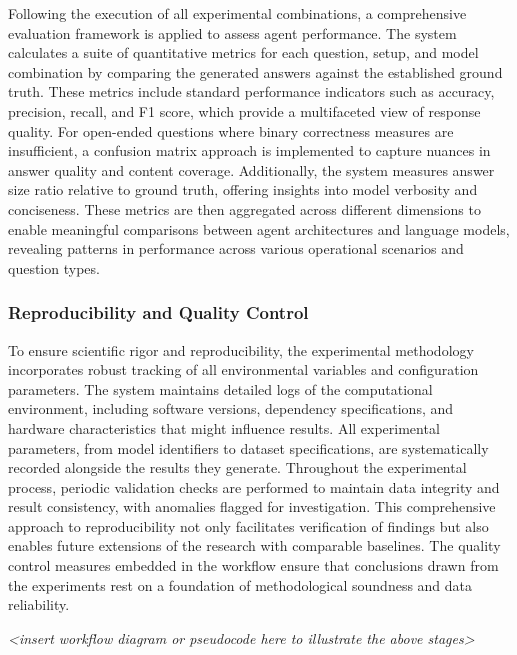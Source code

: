                 Following the execution of all experimental combinations, a comprehensive evaluation framework is applied to assess agent performance. 
                The system calculates a suite of quantitative metrics for each question, setup, and model combination by comparing the generated answers against the established ground truth. 
                These metrics include standard performance indicators such as accuracy, precision, recall, and F1 score, which provide a multifaceted view of response quality. For open-ended questions where binary correctness measures are insufficient, a confusion matrix approach is implemented to capture nuances in answer quality and content coverage. Additionally, the system measures answer size ratio relative to ground truth, offering insights into model verbosity and conciseness. 
                These metrics are then aggregated across different dimensions to enable meaningful comparisons between agent architectures and language models, revealing patterns in performance across various operational scenarios and question types.

            \subsubsection{Reproducibility and Quality Control}

                To ensure scientific rigor and reproducibility, the experimental methodology incorporates robust tracking of all environmental variables and configuration parameters. 
                The system maintains detailed logs of the computational environment, including software versions, dependency specifications, and hardware characteristics that might influence results. 
                All experimental parameters, from model identifiers to dataset specifications, are systematically recorded alongside the results they generate. Throughout the experimental process, periodic validation checks are performed to maintain data integrity and result consistency, with anomalies flagged for investigation. This comprehensive approach to reproducibility not only facilitates verification of findings but also enables future extensions of the research with comparable baselines. The quality control measures embedded in the workflow ensure that conclusions drawn from the experiments rest on a foundation of methodological soundness and data reliability.

                \textit{<insert workflow diagram or pseudocode here to illustrate the above stages>}

